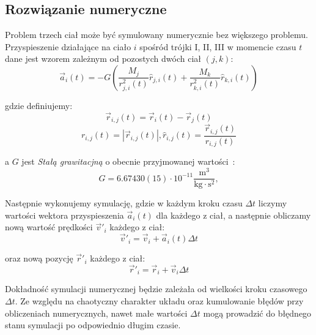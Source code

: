 \documentclass{article}
\begin{document}
\subsection{Rozwiązanie numeryczne}
\label{sec:introduction:numerical}
Problem trzech ciał może być symulowany numerycznie bez większego problemu. Przyspieszenie działające na ciało $i$ spośród trójki I, II, III w momencie czasu $t$ dane jest wzorem zależnym od pozostych dwóch ciał $(j, k)$:
\begin{equation}
    \vec{a}_{i}(t) = -G \left( \frac{M_{j}}{r_{j, i}^2(t)} \hat{r}_{j, i}(t) + \frac{M_{k}}{r_{k, i}^2(t)} \hat{r}_{k, i}(t) \right)
\label{eq:numerical_acceleration}
\end{equation}

gdzie definiujemy:
\begin{displaymath}
    \vec{r}_{i, j}(t) = \vec{r}_i(t) - \vec{r}_j(t)
\end{displaymath}
\begin{displaymath}
    r_{i, j}(t) = \left| \vec{r}_{i, j}(t) \right|,
    \hat{r}_{i, j}(t) = \frac{ \vec{r}_{i, j}(t) }{ r_{i, j}(t) }
\end{displaymath}

a $G$ jest \textit{Stałą grawitacjną} o obecnie przyjmowanej wartości~\cite{codata2018}:
\begin{displaymath}
    {G=6.67430(15)\cdot 10^{-11}
    \operatorname {\frac {m^{3}}{kg\cdot s^{2}}} ,}
\end{displaymath}

Następnie wykonujemy symulację, gdzie w każdym kroku czasu $\Delta t$ liczymy wartości wektora przyspieszenia $\vec{a}_{i}(t)$ dla każdego z ciał, a następnie obliczamy nową wartość prędkości $\vec{v}'_i$ każdego z ciał:
\begin{equation}
    \vec{v}'_i = \vec{v}_i + \vec{a}_{i}(t) \Delta t
\label{eq:numerical_update_v}
\end{equation}

oraz nową pozycję $\vec{r}'_i$ każdego z ciał:
\begin{equation}
    \vec{r}'_i = \vec{r}_i + \vec{v}_i \Delta t
\label{eq:numerical_update_r}
\end{equation}

Dokładność symulacji numerycznej będzie zależała od wielkości kroku czasowego $\Delta t$. Ze względu na chaotyczny charakter układu oraz kumulowanie błędów przy obliczeniach numerycznych, nawet małe wartości $\Delta t$ mogą prowadzić do błędnego stanu symulacji po odpowiednio długim czasie.
\end{document}
